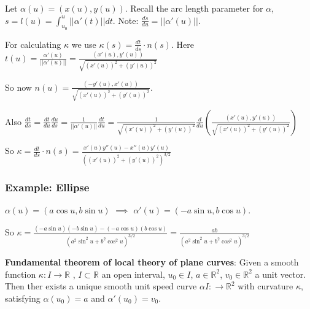 Let $\alpha(u) = (x(u), y(u))$. Recall the arc length parameter for $\alpha$, $s = l(u) = \int_{u_0}^u || \alpha'(t)|| dt$. Note: $\frac{ds}{du} = || \alpha'(u)||.$

For calculating $\kappa$ we use $\kappa(s) = \frac{dt}{ds} \cdot n(s)$. Here $t(u) = \frac{\alpha'(u)}{||\alpha'(u)||} = \frac{(x'(u), y'(u))}{\sqrt{(x'(u))^2 + (y'(u))^2}}$

So now $n(u) = \frac{(-y'(u), x'(u))}{\sqrt{(x'(u))^2 + (y'(u))^2}}$.

Also $\frac{dt}{ds} = \frac{dt}{du} \frac{du}{ds} = \frac{1}{||\alpha'(u)||} \frac{dt}{du} = \frac{1}{\sqrt{(x'(u))^2 + (y'(u))^2}} \frac{d}{du} \left(\frac{(x'(u), y'(u))}{\sqrt{(x'(u))^2 + (y'(u))^2}}\right)$

So $\kappa = \frac{dt}{ds} \cdot n(s) = \frac{x'(u) y''(u) - x''(u) y'(u)}{((x'(u))^2 + (y'(u))^2)^{3/2}}$

\subsubsection*{Example: Ellipse}

$\alpha (u) = (a \cos u, b \sin u)$ $\implies$ $\alpha'(u) = (- a \sin u, b \cos u)$.

So $\kappa = \frac{(-a \sin u)(-b \sin u) - (-a \cos u)(b \cos u)}{(a^2 \sin^2 u + b^2 \cos^2 u)^{3/2}} = \frac{ab}{(a^2 \sin^2 u + b^2 \cos^2 u)^{3/2}}$

\textbf{Fundamental theorem of local theory of plane curves}: Given a smooth function $\kappa : I \rightarrow \mathbb{R}$ , $I \subset \mathbb{R}$ an open interval, $u_0 \in I$, $a \in \mathbb{R}^2$, $v_0 \in \mathbb{R}^2$ a unit vector. Then ther exists a unique smooth unit speed curve $\alpha I : \rightarrow \mathbb{R}^2$ with curvature $\kappa$, satisfying $\alpha(u_0) = a$ and $\alpha'(u_0) = v_0$.